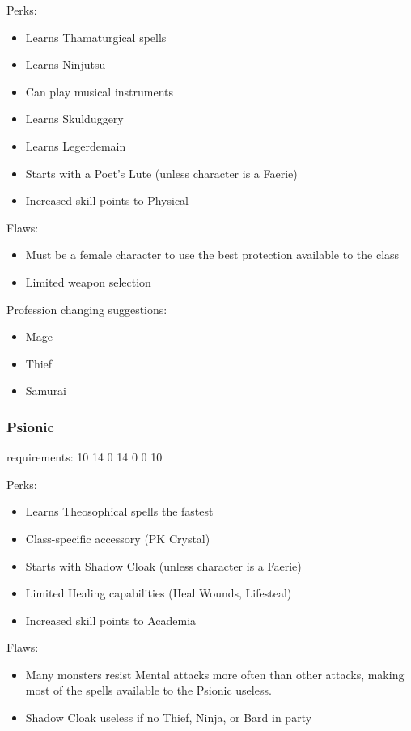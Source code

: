 \documentclass[12pt]{article}
\providecommand{\tightlist}{%
  \setlength{\itemsep}{0pt}\setlength{\parskip}{0pt}}
\newcommand{\indexSpell}[1]{\index{#1}}
\newcommand{\spell}[1]{#1\indexSpell{#1}}
\newcommand{\WviiTwoColumnSetup}{\raggedcolumns\RaggedRight}
\begin{document}
\begin{multicols}{2}\WviiTwoColumnSetup
Perks:

\begin{itemize}
\item
  Learns Thamaturgical spells
\item
  Learns Ninjutsu
\item
  Can play musical instruments
\item
  Learns Skulduggery
\item
  Learns Legerdemain
\item
  Starts with a Poet's Lute (unless character is a Faerie)
\item
  Increased skill points to Physical
\end{itemize}
\columnbreak

Flaws:

\begin{itemize}
\item
  Must be a female character to use the best protection available to the
  class
\item
  Limited weapon selection
\end{itemize}
\end{multicols}

Profession changing suggestions:

\begin{itemize}
\item
  Mage
\item
  Thief
\item
  Samurai
\end{itemize}

\subsubsection{Psionic}\label{psionic}

requirements: 10 14 0 14 0 0 10

\begin{multicols}{2}\WviiTwoColumnSetup
Perks:

\begin{itemize}
\item
  Learns Theosophical spells the fastest
\item
  Class-specific accessory (PK Crystal)
\item
  Starts with Shadow Cloak (unless character is a Faerie)
\item
  Limited Healing capabilities (\spell{Heal Wounds}, \spell{Lifesteal})
\item
  Increased skill points to Academia
\end{itemize}
\columnbreak

Flaws:

\begin{itemize}
\tightlist
\item
  Many monsters resist Mental attacks more often than other attacks,
  making most of the spells available to the Psionic useless.
\item
  Shadow Cloak useless if no Thief, Ninja, or Bard in party
\end{itemize}
\end{multicols}
\end{document}
